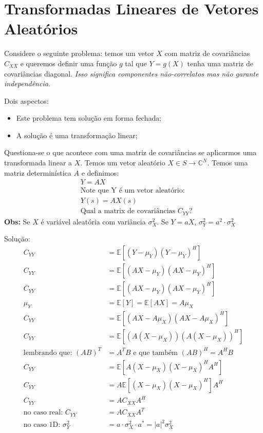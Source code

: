 \documentclass{article}
\renewcommand\bf[1]{\textbf{#1}}
\renewcommand\it[1]{\textit{#1}}
\begin{document}
\setlength{\abovedisplayskip}{12pt}
\setlength{\belowdisplayskip}{12pt}
\setlength{\abovedisplayshortskip}{0pt}
\setlength{\belowdisplayshortskip}{0pt}
\setlength{\jot}{1pt}

\section{Transformadas Lineares de Vetores Aleatórios}
Considere o seguinte problema: temos um vetor $X$ com matriz de covariâncias $C_{XX}$ e queremos
definir uma função $g$ tal que $Y = g(X)$ tenha uma matriz de covariâncias diagonal. \it{Isso
significa componentes não-correlatos mas não garante independência.}

Dois aspectos:
\begin{itemize}
    \item Este problema tem solução em forma fechada;
    \item A solução é uma transformação linear;
\end{itemize}

Questiona-se o que acontece com uma matriz de covariâncias se aplicarmos uma transformada linear a
$X$. Temos um vetor aleatório $X \in S \to \mathbb{C}^N$. Temos uma matriz determinística $A$ e
definimos:
\begin{align*}
    &Y = A X \\
      &\text{Note que Y é um vetor aleatório:} \\
      &Y(s) = A X(s) \\
         &\text{Qual a matrix de covariâncias } C_{YY}?
\end{align*}
\bf{Obs:} Se $X$ é variável aleatória com variância $\sigma_X^2$. Se $Y = aX$, $\sigma_Y^2 = a^2
\cdot \sigma_X^2$

Solução:
\begin{align*}
    C_{YY} &= \mathbb{E}[(Y-\mu_Y)(Y-\mu_Y)^H] \\
    C_{YY} &= \mathbb{E}[(AX-\mu_Y)(AX-\mu_Y)^H] \\
    C_{YY} &= \mathbb{E}[(AX-\mu_Y)(AX-\mu_Y)^H] \\
    \mu_Y &= \mathbb{E}[Y] = \mathbb{E}[AX] = A\mu_X \\
    C_{YY} &= \mathbb{E}[(AX-A\mu_X)(AX-A\mu_X)^H] \\
    C_{YY} &= \mathbb{E}[(A(X-\mu_X))(A(X-\mu_X))^H] \\
    \text{lembrando que: } (AB)^T &= A^TB \text{ e que também } (AB)^H = A^HB \\
    C_{YY} &= \mathbb{E}[A(X-\mu_X)(X-\mu_X)^HA^H] \\
    C_{YY} &= A\mathbb{E}[(X-\mu_X)(X-\mu_X)^H]A^H \\
    C_{YY} &= AC_{XX}A^H \\
    \text{no caso real: } C_{YY} &= AC_{XX}A^T \\
    \text{no caso 1D: } \sigma_Y^2 &= a \cdot \sigma_X^2 \cdot a^* = |a|^2 \sigma_X^2
\end{align*}
\end{document}
